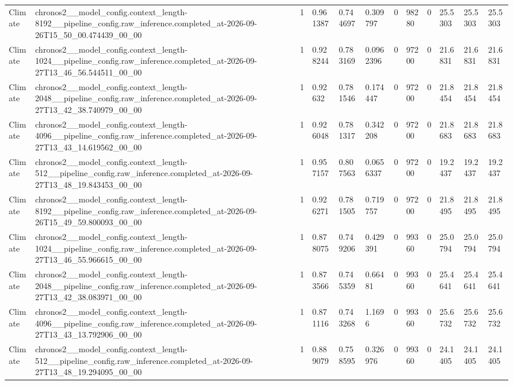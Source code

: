 \begin{tabular}{llllllllllll}
Climate & chronos2\_\_model\_config.context\_length-8192\_\_pipeline\_config.raw\_inference.completed\_at-2026-09-26T15\_50\_00.474439\_00\_00 & 1 & 0.961387 & 0.744697 & 0.309797 & 0 & 98280 & 0 & 25.5303 & 25.5303 & 25.5303 \\
Climate & chronos2\_\_model\_config.context\_length-1024\_\_pipeline\_config.raw\_inference.completed\_at-2026-09-27T13\_46\_56.544511\_00\_00 & 1 & 0.928244 & 0.783169 & 0.0962396 & 0 & 97200 & 0 & 21.6831 & 21.6831 & 21.6831 \\
Climate & chronos2\_\_model\_config.context\_length-2048\_\_pipeline\_config.raw\_inference.completed\_at-2026-09-27T13\_42\_38.740979\_00\_00 & 1 & 0.92632 & 0.781546 & 0.174447 & 0 & 97200 & 0 & 21.8454 & 21.8454 & 21.8454 \\
Climate & chronos2\_\_model\_config.context\_length-4096\_\_pipeline\_config.raw\_inference.completed\_at-2026-09-27T13\_43\_14.619562\_00\_00 & 1 & 0.926048 & 0.781317 & 0.342208 & 0 & 97200 & 0 & 21.8683 & 21.8683 & 21.8683 \\
Climate & chronos2\_\_model\_config.context\_length-512\_\_pipeline\_config.raw\_inference.completed\_at-2026-09-27T13\_48\_19.843453\_00\_00 & 1 & 0.957157 & 0.807563 & 0.0656337 & 0 & 97200 & 0 & 19.2437 & 19.2437 & 19.2437 \\
Climate & chronos2\_\_model\_config.context\_length-8192\_\_pipeline\_config.raw\_inference.completed\_at-2026-09-26T15\_49\_59.800093\_00\_00 & 1 & 0.926271 & 0.781505 & 0.719757 & 0 & 97200 & 0 & 21.8495 & 21.8495 & 21.8495 \\
Climate & chronos2\_\_model\_config.context\_length-1024\_\_pipeline\_config.raw\_inference.completed\_at-2026-09-27T13\_46\_55.966615\_00\_00 & 1 & 0.878075 & 0.749206 & 0.429391 & 0 & 99360 & 0 & 25.0794 & 25.0794 & 25.0794 \\
Climate & chronos2\_\_model\_config.context\_length-2048\_\_pipeline\_config.raw\_inference.completed\_at-2026-09-27T13\_42\_38.083971\_00\_00 & 1 & 0.873566 & 0.745359 & 0.66481 & 0 & 99360 & 0 & 25.4641 & 25.4641 & 25.4641 \\
Climate & chronos2\_\_model\_config.context\_length-4096\_\_pipeline\_config.raw\_inference.completed\_at-2026-09-27T13\_43\_13.792906\_00\_00 & 1 & 0.871116 & 0.743268 & 1.1696 & 0 & 99360 & 0 & 25.6732 & 25.6732 & 25.6732 \\
Climate & chronos2\_\_model\_config.context\_length-512\_\_pipeline\_config.raw\_inference.completed\_at-2026-09-27T13\_48\_19.294095\_00\_00 & 1 & 0.889079 & 0.758595 & 0.326976 & 0 & 99360 & 0 & 24.1405 & 24.1405 & 24.1405 \\

\end{tabular}
